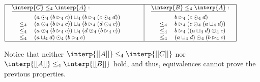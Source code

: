 \begin{example}
\begin{center}
  \begin{math}
    \footnotesize
    \begin{array}{|ll|l|}
      \hline
      \begin{array}{lll}
        \underline{\interp{C} \leq_4 \interp{A}}:\\[4px]
        \,\,\,\,\begin{array}{rl}
               & (a \odot_4 (b \rhd_4 c)) \sqcup_4 (b \rhd_4 (c \odot_4 d))\\
        \leq_4 &  (a \odot_4 (b \rhd_4 c)) \sqcup_4 (b \rhd_4 (d \odot_4 c))\\
        \leq_4 &  (a \odot_4 (b \rhd_4 c)) \sqcup_4 (d \odot_4 (b \rhd_4 c))\\
        \leq_4 &  (a \sqcup_4 d) \odot_4 (b \rhd_4 c)\\
        \end{array}
      \end{array}
      & \quad &
      \begin{array}{lll}
        \underline{\interp{B} \leq_4 \interp{A}}:\\[4px]
        \,\,\,\,\,\begin{array}{lll}
               & b \rhd_4 (c \odot_4 d)\\
        \leq_4 &  b \rhd_4 (c \odot_4 (a \sqcup_4 d))\\
        \leq_4 &  b \rhd_4 ((a \sqcup_4 d) \odot_4 c)\\
        \leq_4 & (a \sqcup_4 d) \odot_4 (b \rhd_4 c)\\
        \end{array}
      \end{array}\\
      \hline
    \end{array}
  \end{math}
\end{center}
Notice that neither $\interp{[[A]]} \leq_4 \interp{[[C]]}$ nor $\interp{[[A]]} \leq_4 \interp{[[B]]}$
hold, and thus, equivalences cannot prove the previous properties.
\end{example}



